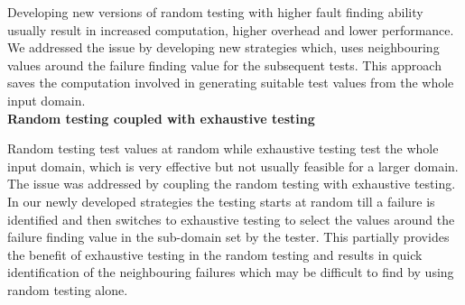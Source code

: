 Developing new versions of random testing with higher fault finding ability usually result in increased computation, higher overhead and lower performance. We addressed the issue by developing new strategies which, uses neighbouring values around the failure finding value for the subsequent tests. This approach saves the computation involved in generating suitable test values from the whole input domain. \\

\textbf{Random testing coupled with exhaustive testing}

Random testing test values at random while exhaustive testing test the whole input domain, which is very effective but not usually feasible for a larger domain. The issue was addressed by coupling the random testing with exhaustive testing. In our newly developed strategies the testing starts at random till a failure is identified and then switches to exhaustive testing to select the values around the failure finding value in the sub-domain set by the tester. This partially provides the benefit of exhaustive testing in the random testing and results in quick identification of the neighbouring failures which may be difficult to find by using random testing alone.\\







